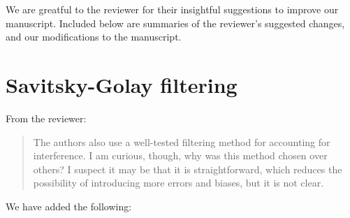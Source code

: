 \documentclass{article}
\begin{document}
We are greatful to the reviewer for their insightful suggestions to improve our manuscript.
Included below are summaries of the reviewer's suggested changes, and our modifications to the manuscript.

\section{Savitsky-Golay filtering}

From the reviewer:

\begin{quote}
The authors also use a well-tested filtering method for accounting for interference.
I am curious, though, why was this method chosen over others? I suspect it may be that it is straightforward, which reduces the possibility of introducing more errors and biases, but it is not clear.
\end{quote}
\noindent We have added the following:

\begin{quote}
  
\end{quote}
\end{document}
